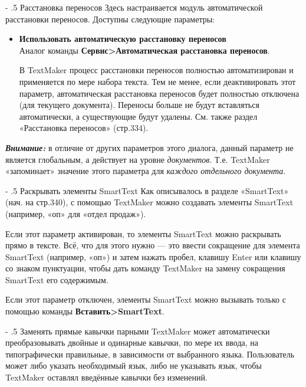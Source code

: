 ﻿\documentclass[a4paper,10pt]{article}
\makeatletter
\renewcommand\paragraph{%
   \@startsection{paragraph}{4}{0mm}%
      {-\baselineskip}%
      {.5\baselineskip}%
      {\normalfont\normalsize\bfseries}}
\makeatother
\begin{document}
 \paragraph{Расстановка переносов}
 Здесь настраивается модуль автоматической расстановки переносов. Доступны следующие параметры:
 \begin{itemize}
  \item \textbf{Использовать автоматическую расстановку переносов}\\
  Аналог команды \textbf{Сервис>Автоматическая расстановка переносов}.
  
  В TextMaker процесс расстановки переносов полностью автоматизирован и применяется по мере набора текста. Тем не менее, если деактивировать этот параметр, автоматическая расстановка переносов будет полностью отключена (для текущего документа). Переносы больше не будут вставляться автоматически, а существующие будут удалены. См. также раздел «Расстановка переносов» (стр.334).
 \end{itemize}

 \begin{mdframed}[backgroundcolor=blue!10]
\textbf{\textit{Внимание:}} в отличие от других параметров этого диалога, данный параметр не является глобальным, а действует на уровне \textit{документов}. Т.е. TextMaker «запоминает» значение этого параметра для \textit{каждого отдельного документа}. 
\end{mdframed}
 
 \paragraph{Раскрывать элементы SmartText}
 Как описывалось в разделе «SmartText» (нач. на стр.340), с помощью TextMaker можно создавать элементы SmartText (например, «оп» для «отдел продаж»).
 
 Если этот параметр активирован, то элементы SmartText можно раскрывать прямо в тексте. Всё, что для этого нужно — это ввести сокращение для элемента SmartText (например, «оп») и затем нажать пробел, клавишу Enter или клавишу со знаком пунктуации, чтобы дать команду TextMaker на замену сокращения SmartText его содержимым.
 
 Если этот параметр отключен, элементы SmartText можно вызывать только с помощью команды \textbf{Вставить>SmartText}.
 
 \paragraph{Заменять прямые кавычки парными}
 TextMaker может автоматически преобразовывать двойные и одинарные кавычки, по мере их ввода, на типографически правильные, в зависимости от выбранного языка. Пользователь может либо указать необходимый язык, либо не указывать язык, чтобы TextMaker оставлял введённые кавычки без изменений.
 
\end{document}

